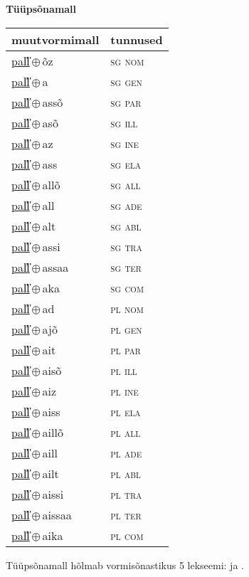 

\vspace{3.5em}
\noindent \begin{minipage}{\textwidth}
\noindent \textbf{Tüüpsõnamall \,}\\

\begin{sideways}
\begin{tabular}{l l}
muutvormimall & tunnused \\
\hline
\underline{pal̕l̕}\,$\oplus$\,õz & \textsc{ sg nom } \\
\underline{pal̕l̕}\,$\oplus$\,a & \textsc{ sg gen } \\
\underline{pal̕l̕}\,$\oplus$\,assõ & \textsc{ sg par } \\
\underline{pal̕l̕}\,$\oplus$\,asõ & \textsc{ sg ill } \\
\underline{pal̕l̕}\,$\oplus$\,az & \textsc{ sg ine } \\
\underline{pal̕l̕}\,$\oplus$\,ass & \textsc{ sg ela } \\
\underline{pal̕l̕}\,$\oplus$\,allõ & \textsc{ sg all } \\
\underline{pal̕l̕}\,$\oplus$\,all & \textsc{ sg ade } \\
\underline{pal̕l̕}\,$\oplus$\,alt & \textsc{ sg abl } \\
\underline{pal̕l̕}\,$\oplus$\,assi & \textsc{ sg tra } \\
\underline{pal̕l̕}\,$\oplus$\,assaa & \textsc{ sg ter } \\
\underline{pal̕l̕}\,$\oplus$\,aka & \textsc{ sg com } \\
\underline{pal̕l̕}\,$\oplus$\,ad & \textsc{ pl nom } \\
\underline{pal̕l̕}\,$\oplus$\,ajõ & \textsc{ pl gen } \\
\underline{pal̕l̕}\,$\oplus$\,ait & \textsc{ pl par } \\
\underline{pal̕l̕}\,$\oplus$\,aisõ & \textsc{ pl ill } \\
\underline{pal̕l̕}\,$\oplus$\,aiz & \textsc{ pl ine } \\
\underline{pal̕l̕}\,$\oplus$\,aiss & \textsc{ pl ela } \\
\underline{pal̕l̕}\,$\oplus$\,aillõ & \textsc{ pl all } \\
\underline{pal̕l̕}\,$\oplus$\,aill & \textsc{ pl ade } \\
\underline{pal̕l̕}\,$\oplus$\,ailt & \textsc{ pl abl } \\
\underline{pal̕l̕}\,$\oplus$\,aissi & \textsc{ pl tra } \\
\underline{pal̕l̕}\,$\oplus$\,aissaa & \textsc{ pl ter } \\
\underline{pal̕l̕}\,$\oplus$\,aika & \textsc{ pl com } \\
\end{tabular}
\end{sideways}
\label{tab:tüüpsõnamall-pal̕l̕õz}

\end{minipage}

 
\vspace{1em}
\noindent Tüüpsõnamall  hõlmab vormisõnastikus 5 lekseemi:  ja .
